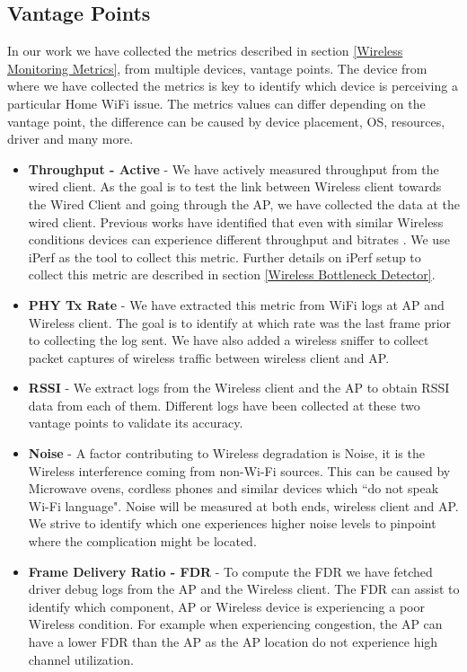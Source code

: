 \subsection{Vantage Points}

In our work we have collected the metrics described in section \ref{Wireless Monitoring Metrics}, from multiple devices, vantage points. The device from where we have collected the metrics is key to identify which device is perceiving a particular Home WiFi issue. The metrics values can differ depending on the vantage point, the difference can be caused by device placement, OS, resources, driver and many more.

\begin{itemize}
	\item \textbf{Throughput - Active} - We have actively measured throughput from the wired client. As the goal is to test the link between Wireless client towards the Wired Client and going through the AP, we have collected the data at the wired client. Previous works have identified that even with similar Wireless conditions devices can experience different throughput and bitrates \cite{measuring_user_traffic}. We use iPerf as the tool to collect this metric. Further details on iPerf setup to collect this metric are described in section \ref{Wireless Bottleneck Detector}.
	
	\item \textbf{PHY Tx Rate} - We have extracted this metric from WiFi logs at AP and Wireless client. The goal is to identify at which rate was the last frame prior to collecting the log sent. We have also added a wireless sniffer to collect packet captures of wireless traffic between wireless client and AP.
	
	\item \textbf{RSSI} - We extract logs from the Wireless client and the AP to obtain RSSI data from each of them. Different logs have been collected at these two vantage points to validate its accuracy.
	
	\item \textbf{Noise} - A factor contributing to Wireless degradation is Noise, it is the Wireless interference coming from non-Wi-Fi sources. This can be caused by Microwave ovens, cordless phones and similar devices which ``do not speak Wi-Fi language". Noise will be measured at both ends, wireless client and AP. We strive to identify which one experiences higher noise levels to pinpoint where the complication might be located.
	
	\item \textbf{Frame Delivery Ratio - FDR } - To compute the FDR we have fetched driver debug logs from the AP and the Wireless client. The FDR can assist to identify which component, AP or Wireless device is experiencing a poor Wireless condition. For example when experiencing congestion, the AP can have a lower FDR than the AP as the AP location do not experience high channel utilization.
	

\end{itemize}
